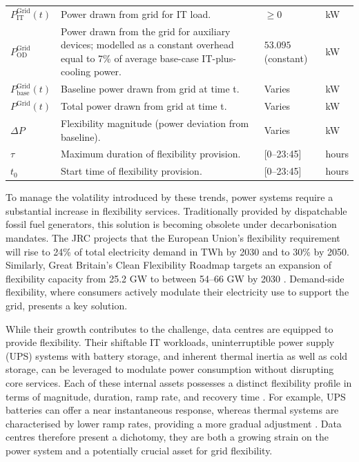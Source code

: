 \documentclass[lettersize,journal]{IEEEtran}
\newcommand{\rev}[1]{\textcolor{blue!70!black}{#1}}
\begin{document}
{{\begin{longtable}{p{} p{} p{} p{}}
$P^{\mathrm{Grid}}_{\mathrm{IT}}(t)$ & Power drawn from grid for IT load. & $\geq 0$ &kW \\
$P^{\mathrm{Grid}}_{\mathrm{OD}}$ & \rev{Power drawn from the grid for auxiliary devices; modelled as a constant overhead equal to 7\% of average base-case IT-plus-cooling power.} & \rev{$53.095$ (constant)} &kW \\
$P^{\mathrm{Grid}}_{\mathrm{base}}(t)$ & Baseline power drawn from grid at time t. & Varies &kW \\
$P^{\mathrm{Grid}}(t)$ & Total power drawn from grid at time t. & Varies &kW \\
$\Delta P$ & Flexibility magnitude (power deviation from baseline). & Varies &kW \\
$\tau$ & Maximum duration of flexibility provision. & [0--23:45] & hours \\
$t_0$ & Start time of flexibility provision. & [0--23:45] & hours \\
\end{longtable}
\twocolumn
}
} %
To manage the volatility introduced by these trends, power systems require a substantial increase in flexibility services. Traditionally provided by dispatchable fossil fuel generators, this solution is becoming obsolete under decarbonisation mandates. The JRC \cite{koolen2023flexibility} projects that the European Union's flexibility requirement will rise to 24\% of total electricity demand in TWh by 2030 and to 30\% by 2050. Similarly, Great Britain's Clean Flexibility Roadmap targets an expansion of flexibility capacity from 25.2 GW to between 54--66 GW by 2030 \cite{clean_flexibility_roadmap}. Demand-side flexibility, where consumers actively modulate their electricity use to support the grid, presents a key solution.

While their growth contributes to the challenge, data centres are equipped to provide flexibility. Their shiftable IT workloads, uninterruptible power supply (UPS) systems with battery storage, and inherent thermal inertia as well as cold storage, can be leveraged to modulate power consumption without disrupting core services. Each of these internal assets possesses a distinct flexibility profile in terms of magnitude, duration, ramp rate, and recovery time \cite{zhang2025unlocking}. For example, UPS batteries can offer a near instantaneous response, whereas thermal systems are characterised by lower ramp rates, providing a more gradual adjustment \cite{zhang2025unlocking, alapera2018data}. Data centres therefore present a dichotomy, they are both a growing strain on the power system and a potentially crucial asset for grid flexibility.
\end{document}
